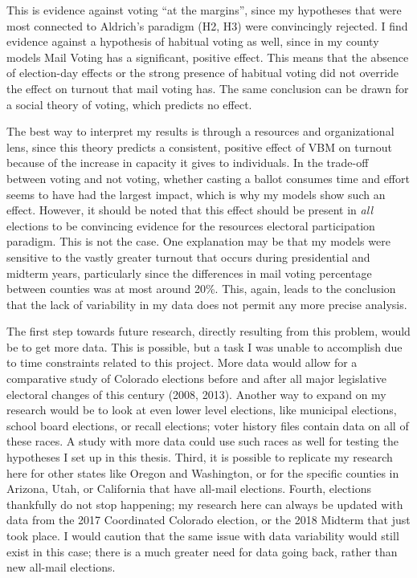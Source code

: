\documentclass[12pt,twoside]{reedthesis}
\begin{document}
  This is evidence against voting ``at the margins'', since my hypotheses
  that were most connected to Aldrich's paradigm (H2, H3) were
  convincingly rejected. I find evidence against a hypothesis of habitual
  voting as well, since in my county models Mail Voting has a significant,
  positive effect. This means that the absence of election-day effects or
  the strong presence of habitual voting did not override the effect on
  turnout that mail voting has. The same conclusion can be drawn for a
  social theory of voting, which predicts no effect.
  
  The best way to interpret my results is through a resources and
  organizational lens, since this theory predicts a consistent, positive
  effect of VBM on turnout because of the increase in capacity it gives to
  individuals. In the trade-off between voting and not voting, whether
  casting a ballot consumes time and effort seems to have had the largest
  impact, which is why my models show such an effect. However, it should
  be noted that this effect should be present in \emph{all} elections to
  be convincing evidence for the resources electoral participation
  paradigm. This is not the case. One explanation may be that my models
  were sensitive to the vastly greater turnout that occurs during
  presidential and midterm years, particularly since the differences in
  mail voting percentage between counties was at most around 20\%. This,
  again, leads to the conclusion that the lack of variability in my data
  does not permit any more precise analysis.
  
  The first step towards future research, directly resulting from this
  problem, would be to get more data. This is possible, but a task I was
  unable to accomplish due to time constraints related to this project.
  More data would allow for a comparative study of Colorado elections
  before and after all major legislative electoral changes of this century
  (2008, 2013). Another way to expand on my research would be to look at
  even lower level elections, like municipal elections, school board
  elections, or recall elections; voter history files contain data on all
  of these races. A study with more data could use such races as well for
  testing the hypotheses I set up in this thesis. Third, it is possible to
  replicate my research here for other states like Oregon and Washington,
  or for the specific counties in Arizona, Utah, or California that have
  all-mail elections. Fourth, elections thankfully do not stop happening;
  my research here can always be updated with data from the 2017
  Coordinated Colorado election, or the 2018 Midterm that just took place.
  I would caution that the same issue with data variability would still
  exist in this case; there is a much greater need for data going back,
  rather than new all-mail elections.
  
\end{document}
